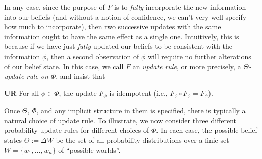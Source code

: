 \documentclass{article}
\begin{document}
In any case, since the purpose of $F$ is to \emph{fully} incorporate the new information into our beliefs
(and without a notion of confidence, we can't very well specify how much to incorporate), then
two successive updates with the same information ought to have the same effect as a single one.
Intuitively, this is because if we have just \emph{fully} updated our beliefs to be consistent with the information $\phi$, then a second observation of $\phi$ will require no further alterations of our belief state.
In this case, we call $F$ an \emph{update rule}, or more precisely, a \emph{$\Theta$-update rule on $\Phi$}, and insist that
\begin{CFaxioms}
	\item[\textbf{UR}] For all $\phi \in \Phi$, the update $F_\phi$ is
	idempotent (i.e., $F_\phi \circ F_\phi = F_\phi$).
\end{CFaxioms}


Once $\Theta$, $\Phi$, and any implicit structure in them is specified, there is typically a natural choice of update rule. 
To illustrate, we now consider three different probability-update rules for different choices of $\Phi$.
In each case, the possible belief states $\Theta := \Delta W$ be the set of all probability distributions over a finie set $W = \{w_1, \ldots, w_n\}$ of ``possible worlds''. 
\end{document}

